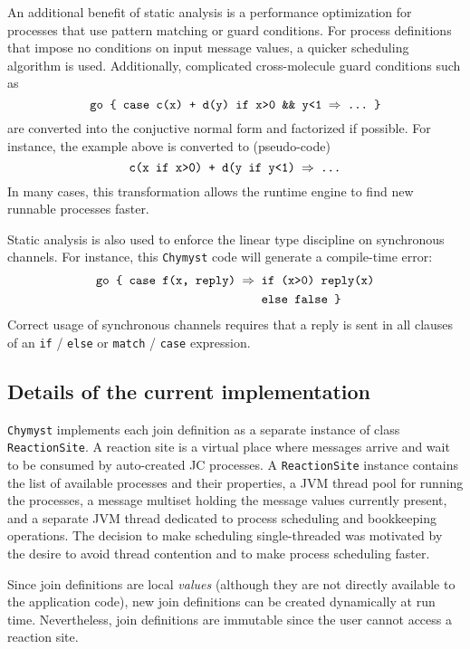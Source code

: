 \documentclass[sigplan,10pt,review,anonymous]{acmart}\settopmatter{printfolios=true}
\begin{document}
An additional benefit of static analysis is a performance optimization
for processes that use pattern matching or guard conditions. For process
definitions that impose no conditions on input message values, a quicker
scheduling algorithm is used. Additionally, complicated cross-molecule
guard conditions such as
\[
\text{\texttt{go \{ case c(x) + d(y) if x>0 \&\& y<1 \ensuremath{\Rightarrow} ...~\}}}
\]
are converted into the conjuctive normal form and factorized if possible.
For instance, the example above is converted to (pseudo-code)
\[
\text{\texttt{c(x if x>0) + d(y if y<1) \ensuremath{\Rightarrow} ...}}
\]
In many cases, this transformation allows the runtime engine to find
new runnable processes faster.

Static analysis is also used to enforce the linear type discipline
on synchronous channels. For instance, this \texttt{Chymyst} code
will generate a compile-time error:
\begin{align*}
\text{\texttt{go \{ case f(x, reply) \ensuremath{\Rightarrow}}} & \text{\texttt{ if (x>0) reply(x)}}\\
 & \text{\text{\texttt{ else false \}}}}
\end{align*}
Correct usage of synchronous channels requires that a reply is sent
in all clauses of an \texttt{if} / \texttt{else} or \texttt{match}
/ \texttt{case} expression.

\subsection{Details of the current implementation}

\texttt{Chymyst} implements each join definition as a separate instance
of class \texttt{ReactionSite}. A reaction site is a virtual place
where messages arrive and wait to be consumed by auto-created JC processes.
A \texttt{ReactionSite} instance contains the list of available processes
and their properties, a JVM thread pool for running the processes,
a message multiset holding the message values currently present, and
a separate JVM thread dedicated to process scheduling and bookkeeping
operations. The decision to make scheduling single-threaded was motivated
by the desire to avoid thread contention and to make process scheduling
faster.

Since join definitions are local \emph{values} (although they are
not directly available to the application code), new join definitions
can be created dynamically at run time. Nevertheless, join definitions
are immutable since the user cannot access a reaction site.
\end{document}
